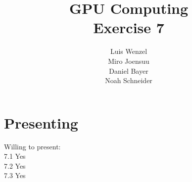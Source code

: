 \documentclass[12pt,twoside,a4paper]{article}
\title{GPU Computing\\
Exercise 7}
\author{
  Luis Wenzel\\
  Miro Joensuu\\
  Daniel Bayer\\
  Noah Schneider
}
\date{}
\begin{document}
\maketitle

\section{Presenting}
\begin{center}
    Willing to present:\\
    7.1 Yes\\
    7.2 Yes\\
    7.3 Yes\\
\end{center}

\FloatBarrier
	
\FloatBarrier

\FloatBarrier
\end{document}
